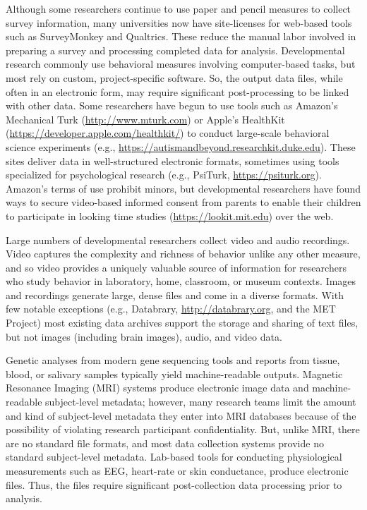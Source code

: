 \documentclass[letterpaper,man,apacite,natbib]{apa6}
\begin{document}
Although some researchers continue to use paper and pencil measures to collect survey information, many universities now have site-licenses for web-based tools such as SurveyMonkey and Qualtrics.
These reduce the manual labor involved in preparing a survey and processing completed data for analysis. 
Developmental research commonly use behavioral measures involving computer-based tasks, but most rely on custom, project-specific software.
So, the output data files, while often in an electronic form, may require significant post-processing to be linked with other data.
Some researchers have begun to use tools such as Amazon's Mechanical Turk (\url{http://www.mturk.com}) or Apple's HealthKit (\url{https://developer.apple.com/healthkit/}) to conduct large-scale behavioral science experiments (e.g., \url{https://autismandbeyond.researchkit.duke.edu}).
These sites deliver data in well-structured electronic formats, sometimes using tools specialized for psychological research (e.g., PsiTurk, \url{https://psiturk.org}).
Amazon's terms of use prohibit minors, but developmental researchers have found ways to secure video-based informed consent from parents to enable their children to participate in looking time studies (\url{https://lookit.mit.edu}) over the web.

Large numbers of developmental researchers collect video and audio recordings.
Video captures the complexity and richness of behavior unlike any other measure, and so video provides a uniquely valuable source of information for researchers who study behavior in laboratory, home, classroom, or museum contexts. 
Images and recordings generate large, dense files and come in a diverse formats.
With few notable exceptions (e.g., Databrary, \url{http://databrary.org}, and the MET Project) most existing data archives support the storage and sharing of text files, but not images (including brain images), audio, and video data.

Genetic analyses from modern gene sequencing tools and reports from tissue, blood, or salivary samples typically yield machine-readable outputs.
Magnetic Resonance Imaging (MRI) systems produce electronic image data and machine-readable subject-level metadata; however, many research teams limit the amount and kind of subject-level metadata they enter into MRI databases because of the possibility of violating research participant confidentiality.
But, unlike MRI, there are no standard file formats, and most data collection systems provide no standard subject-level metadata.
Lab-based tools for conducting physiological measurements such as EEG, heart-rate or skin conductance, produce electronic files.
Thus, the files require significant post-collection data processing prior to analysis. 
\end{document}

